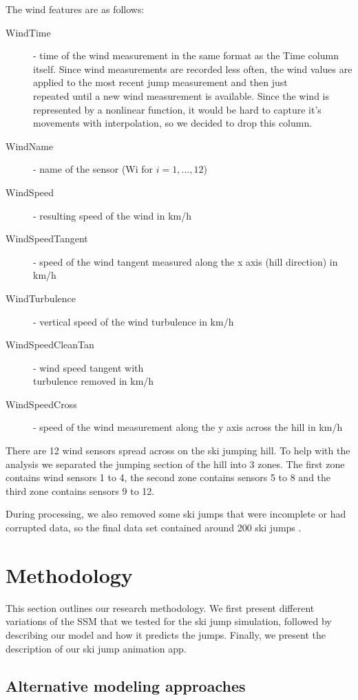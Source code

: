 \documentclass[sigconf,natbib=false, language=english]{acmart}
\begin{document}
The wind features are as follows:
\begin{description}
    \item [WindTime] - time of the wind measurement in the same format as the Time column itself. Since wind measurements
    are recorded less often, the wind values are applied to the most recent jump measurement and then just \\
    repeated until a new wind measurement is available. Since the wind is represented by a nonlinear function, it would be hard to capture
    it's movements with interpolation, so we decided to drop this column.
    \item [WindName] - name of the sensor (Wi for $i = 1,\ldots,12$)
    \item [WindSpeed] - resulting speed of the wind in km/h 
    \item [WindSpeedTangent] - speed of the wind tangent measured along the x axis (hill direction) in km/h
    \item [WindTurbulence] - vertical speed of the wind turbulence in km/h
    \item [WindSpeedCleanTan] - wind speed tangent with\\
     turbulence removed in km/h
    \item [WindSpeedCross] - speed of the wind measurement along the y axis across the hill in km/h
\end{description}

There are 12 wind sensors spread across on the ski jumping hill. To help with
the analysis we separated the jumping section of the hill into 3 zones. The first zone
contains wind sensors 1 to 4, the second zone contains sensors 5 to 8 and the third zone
contains sensors 9 to 12.

During processing, we also removed some ski jumps that were incomplete or had corrupted data, so the
final data set contained around 200 ski jumps \cite{SkiJumping_Book}.

\section{Methodology}\label{sec:method}
This section outlines our research methodology. We first present different variations 
of the SSM that we tested for the ski jump simulation, followed by describing our model 
and how it predicts the jumps. Finally, we present the description of our ski jump 
animation app.

\subsection{Alternative modeling approaches}
\end{document}
